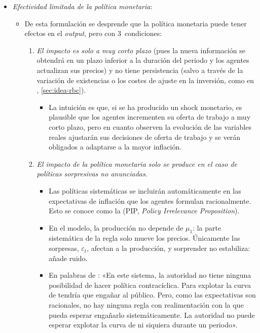 \documentclass[11pt]{article}
\begin{document}
\begin{itemize}
\item \emph{Efectividad limitada de la política monetaria}:
  \begin{itemize}
  \item De esta formulación se desprende que la política monetaria puede tener efectos en el \emph{output}, pero con 3~condiciones:
    \begin{enumerate}[label=\alph*)]
    \item \emph{El impacto es solo a muy corto plazo} (pues la nueva información se obtendrá en un plazo inferior a la duración del periodo y los agentes actualizan sus precios) y no tiene persistencia (salvo a través de la variación de existencias o los costes de ajuste en la inversión, como en \textcite{Lucas1975Equilibrium}, \ref{sec:idea-rbc}).
      \begin{itemize}
      \item La intuición es que, si se ha producido un shock monetario, es plausible que los agentes incrementen su oferta de trabajo a muy corto plazo, pero en cuanto observen la evolución de las variables reales ajustarán sus decisiones de oferta de trabajo y se verán obligados a adaptarse a la mayor inflación.
      \end{itemize}
    \item \emph{El impacto de la política monetaria solo se produce en el caso de políticas sorpresivas no anunciadas}.
      \begin{itemize}
      \item Las políticas sistemáticas se incluirán automáticamente en las expectativas de inflación que los agentes formulan racionalmente\nocite{SargentWallace1975Rational}. Esto se conoce como la  (PIP, \emph{Policy Irrelevance Proposition}).
      \item En el modelo, la producción no depende de $\mu_1$: la parte sistemática de la regla solo mueve los precios. Únicamente las sorpresas, $\varepsilon_t$, afectan a la producción, y sorprender no estabiliza: añade ruido.
      \item En palabras de \textcite{SargentWallace1976Rational}: «En este sistema, la autoridad no tiene ninguna posibilidad de hacer política contracíclica. Para explotar la curva de  tendría que engañar al público. Pero, como las expectativas son racionales, no hay ninguna regla con realimentación con la que pueda esperar engañarlo sistemáticamente. La autoridad no puede esperar explotar la curva de  ni siquiera durante un periodo».

\end{itemize}
\end{enumerate}
\end{itemize}
\end{itemize}
\end{document}
